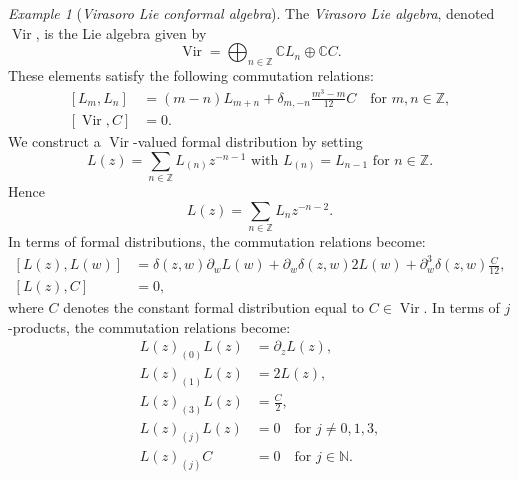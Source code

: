 \documentclass[a4paper, 12pt, reqno]{amsart}
\theoremstyle{remark}
\newtheorem{example}[theorem]{Example}
\numberwithin{equation}{subsection}
\DeclareMathOperator{\Vir}{Vir}
\begin{document}
\begin{example}[\emph{Virasoro Lie conformal algebra}]
  \label{exa:1}
  The \emph{Virasoro Lie algebra}, denoted $\Vir$, is the Lie algebra given by
  \begin{equation*}
    \Vir = \bigoplus_{n \in \mathbb{Z}}\mathbb{C}L_{n} \oplus \mathbb{C}C.
  \end{equation*}
  These elements satisfy the following commutation relations:
  \begin{equation}
    \label{eq:6}
    \begin{split}
      [L_m, L_n] &= (m - n)L_{m + n} + \delta_{m, -n}\frac{m^3 - m}{12}C \quad \text{for }m, n \in \mathbb{Z}, \\
      [\Vir, C] &= 0.
    \end{split}
  \end{equation}
  We construct a $\Vir$-valued formal distribution by setting
  \begin{equation*}
    L(z) = \sum_{n \in \mathbb{Z}}L_{(n)}z^{-n - 1}\text{ with }L_{(n)} = L_{n - 1}\text{ for }n \in \mathbb{Z}.
  \end{equation*}
  Hence
  \begin{equation*}
    L(z) = \sum_{n \in \mathbb{Z}}L_nz^{-n - 2}.
  \end{equation*}
  In terms of formal distributions, the commutation relations become:
  \begin{equation}
    \label{eq:7}
    \begin{split}
      [L(z), L(w)] &= \delta(z, w)\partial_wL(w) + \partial_w\delta(z, w)2L(w) + \partial^3_w\delta(z, w)\frac{C}{12}, \\
      [L(z), C] &= 0,
    \end{split}
  \end{equation}
  where $C$ denotes the constant formal distribution equal to $C \in \Vir$.
  In terms of $j$-products, the commutation relations become:
  \begin{equation}
    \label{eq:8}
    \begin{split}
      L(z)_{(0)}L(z) &= \partial_zL(z), \\
      L(z)_{(1)}L(z) &= 2L(z), \\
      L(z)_{(3)}L(z) &= \frac{C}{2}, \\
      L(z)_{(j)}L(z) &= 0 \quad \text{for }j \neq 0, 1, 3, \\
      L(z)_{(j)}C &= 0 \quad \text{for }j \in \mathbb{N}.
    \end{split}
\end{equation}

\end{example}
\end{document}
